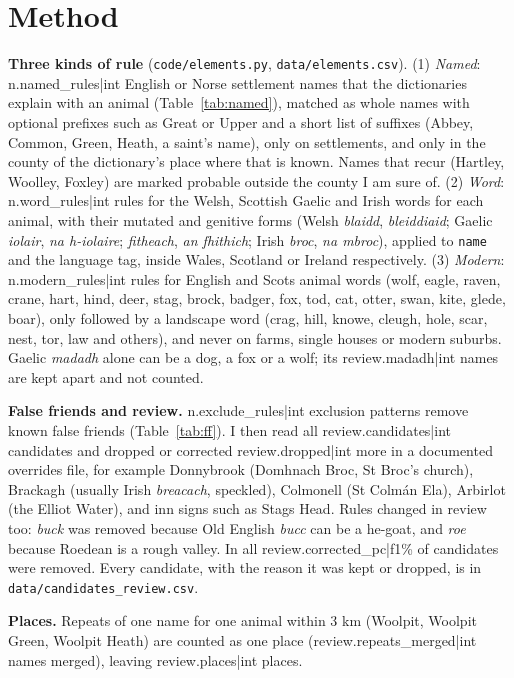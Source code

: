 \documentclass[11pt,a4paper]{article}
\begin{document}
\section{Method}
\textbf{Three kinds of rule} (\texttt{code/elements.py}, \texttt{data/elements.csv}). (1) \textit{Named}: {{n.named_rules|int}} English or Norse settlement names that the dictionaries explain with an animal (Table~\ref{tab:named}), matched as whole names with optional prefixes such as Great or Upper and a short list of suffixes (Abbey, Common, Green, Heath, a saint's name), only on settlements, and only in the county of the dictionary's place where that is known. Names that recur (Hartley, Woolley, Foxley) are marked probable outside the county I am sure of. (2) \textit{Word}: {{n.word_rules|int}} rules for the Welsh, Scottish Gaelic and Irish words for each animal, with their mutated and genitive forms (Welsh \textit{blaidd}, \textit{bleiddiaid}; Gaelic \textit{iolair}, \textit{na h-iolaire}; \textit{fitheach}, \textit{an fhithich}; Irish \textit{broc}, \textit{na mbroc}), applied to \texttt{name} and the language tag, inside Wales, Scotland or Ireland respectively. (3) \textit{Modern}: {{n.modern_rules|int}} rules for English and Scots animal words (wolf, eagle, raven, crane, hart, hind, deer, stag, brock, badger, fox, tod, cat, otter, swan, kite, glede, boar), only followed by a landscape word (crag, hill, knowe, cleugh, hole, scar, nest, tor, law and others), and never on farms, single houses or modern suburbs. Gaelic \textit{madadh} alone can be a dog, a fox or a wolf; its {{review.madadh|int}} names are kept apart and not counted.

\textbf{False friends and review.} {{n.exclude_rules|int}} exclusion patterns remove known false friends (Table~\ref{tab:ff}). I then read all {{review.candidates|int}} candidates and dropped or corrected {{review.dropped|int}} more in a documented overrides file, for example Donnybrook (Domhnach Broc, St Broc's church), Brackagh (usually Irish \textit{breacach}, speckled), Colmonell (St Colm\'an Ela), Arbirlot (the Elliot Water), and inn signs such as Stags Head. Rules changed in review too: \textit{buck} was removed because Old English \textit{bucc} can be a he-goat, and \textit{roe} because Roedean is a rough valley. In all {{review.corrected_pc|f1}}\% of candidates were removed. Every candidate, with the reason it was kept or dropped, is in \texttt{data/candidates\_review.csv}.

\textbf{Places.} Repeats of one name for one animal within 3 km (Woolpit, Woolpit Green, Woolpit Heath) are counted as one place ({{review.repeats_merged|int}} names merged), leaving {{review.places|int}} places.
\end{document}

